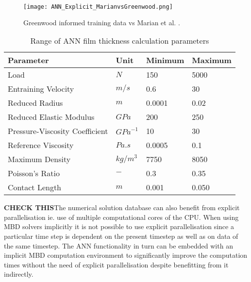 \begin{figure}  
	\texttt{[image: ANN\_Explicit\_MarianvsGreenwood.png]}
	\caption{Greenwood informed training data vs Marian et al. \cite{Marian2022}.}
	\label{Greenwood informed training data vs Marian et al.}
\end{figure} 

\begin{table*}
	\caption{Range of ANN film thickness calculation parameters}
    \label{Range of ANN film thickness calculation parameters}
	\centering
	\renewcommand{\arraystretch}{1.5}%
	\begin{tabular}{|P{0.4\textwidth}|P{0.15\textwidth}|P{0.15\textwidth}|P{0.15\textwidth}|}
		\hline
		\textbf{Parameter} & \textbf{Unit} & \textbf{Minimum} & \textbf{Maximum} \\ [0.5ex]
		\hline
		Load & $N$ & 150 & 5000 \\ [0.5ex]
		\hline
		Entraining Velocity & $m/s$ & 0.6 & 30 \\ [0.5ex]
		\hline
		Reduced Radius & $m$ & 0.0001 & 0.02 \\ [0.5ex]
		\hline
		Reduced Elastic Modulus & $GPa$ & 200 & 250 \\ [0.5ex]
		\hline
		Pressure-Viscosity Coefficient & ${GPa}^{-1}$ & 10 & 30 \\ [0.5ex]
		\hline
		Reference Viscosity & $Pa.s$ & 0.0005 & 0.1 \\ [0.5ex]
		\hline
		Maximum Density & ${kg}/{m}^3$ & 7750 & 8050 \\ [0.5ex]
		\hline
		Poisson's Ratio & $-$ & 0.3 & 0.35 \\ [0.5ex]
		\hline
		Contact Length & $m$ & 0.001 & 0.050 \\ [0.5ex]
		\hline
		
	\end{tabular}
\end{table*}

\textbf{CHECK THIS}The numerical solution database can also benefit from explicit parallelisation ie. use of multiple computational cores of the CPU. When using MBD solvers implicitly it is not possible to use explicit parallelisation since a particular time step is dependent on the present timestep as well as on data of the same timestep. The ANN functionality in turn can be embedded with an implicit MBD computation environment to significantly improve the computation times without the need of explicit parallelisation despite benefitting from it indirectly. 

